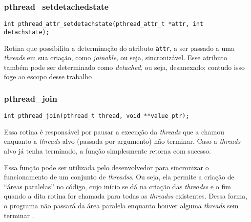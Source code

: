 \subsubsection{pthread\_setdetachedstate}
\begin{lstlisting}
int pthread_attr_setdetachstate(pthread_attr_t *attr, int detachstate);
\end{lstlisting}
Rotina que possibilita a determinação do atributo \texttt{attr}, a ser passado a 
uma \textit{\gls{threads}} em sua criação, como \textit{joinable}, ou seja, 
sincronizável. Esse atributo também pode ser determinado como \textit{detached}, 
ou seja, desanexado; contudo isso foge ao escopo desse trabalho 
\cite{man:pthread_attr_setdetachedstate}.
\\
\subsubsection{pthread\_join}
\begin{lstlisting}
int pthread_join(pthread_t thread, void **value_ptr);
\end{lstlisting}
Essa rotina é responsável por pausar a execução da \textit{\gls{threads}} que a 
chamou enquanto a \textit{\gls{threads}}-alvo (passada por argumento) não terminar. 
Caso a \textit{\gls{threads}}-alvo já tenha terminado, a função simplesmente retorna 
com sucesso.

Essa função pode ser utilizada pelo desenvolvedor para sincronizar o funcionamento 
de um conjunto de \textit{\glspl{threads}}. Ou seja, ela permite a criação de ``áreas 
paralelas'' no código, cujo início se dá na criação das \textit{\glspl{threads}} e 
o fim quando a dita rotina for chamada para todas as \textit{\glspl{threads}} 
existentes. Dessa forma, o programa não passará da área paralela enquanto houver alguma 
\textit{\gls{threads}} sem terminar \cite{man:pthread_join}.
\\